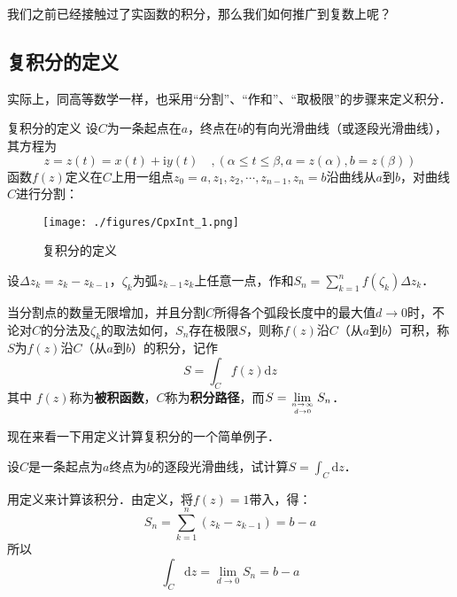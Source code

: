 
我们之前已经接触过了实函数的积分，那么我们如何推广到复数上呢？

\subsection{复积分的定义}

实际上，同高等数学一样，也采用“分割”、“作和”、“取极限”的步骤来定义积分．
\begin{definition}{复积分的定义}
设$C $为一条起点在$a $，终点在$b $的有向光滑曲线（或逐段光滑曲线），其方程为
\begin{equation}
z=z(t)=x(t)+\mathrm{i} y(t) \quad,(\alpha \leqslant t \leqslant \beta, a=z(\alpha), b=z(\beta))
\end{equation}
函数$ f (z) $定义在$C $上用一组点$z_{0}=a, z_{1}, z_{2}, \cdots, z_{n-1}, z_{n}=b$沿曲线从$ a $到$b $，对曲线$C$进行分割：
\begin{figure}[ht]
\centering
\texttt{[image: ./figures/CpxInt\_1.png]}
\caption{复积分的定义} \label{CpxInt_fig1}
\end{figure}
设$\Delta z_{k}=z_{k}-z_{k-1}$，$\zeta_k$为弧$z_{k-1}z_k$上任意一点，作和$\displaystyle S_{n}=\sum_{k=1}^{n} f\left(\zeta_{k}\right) \Delta z_{k}$．

当分割点的数量无限增加，并且分割$C$所得各个弧段长度中的最大值$d \to 0$时，不论对$C$的分法及$\zeta_k$的取法如何，$S_n$存在极限$S$，则称$ f (z)$沿$C $（从$a$到$b$）可积，称$ S $为$ f (z)$沿$C$（从$a$到$b $）的积分，记作
\begin{equation}
S=\int_{C} f(z) \mathrm{d} z
\end{equation}
其中 $f (z)$称为\textbf{被积函数}，$C$称为\textbf{积分路径}，而$\displaystyle S=\lim _{n \rightarrow \infty \atop d \rightarrow 0} S_{n}$．
\end{definition}

现在来看一下用定义计算复积分的一个简单例子．
\begin{example}{}
设$C $是一条起点为$a $终点为$b $的逐段光滑曲线，试计算$\displaystyle S=\int_C\mathrm dz$．

用定义来计算该积分．由定义，将$f(z)=1$带入，得：
\begin{equation}
S_{n}=\sum_{k=1}^{n}\left(z_{k}-z_{k-1}\right)=b-a
\end{equation}
所以
\begin{equation}
\int_{C} \mathrm{d} z=\lim _{d \rightarrow 0} S_{n}=b-a
\end{equation}
\end{example}

